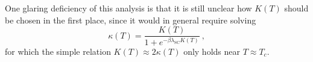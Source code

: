 One glaring deficiency of this analysis is that it is still unclear how $ K(T) $ should be chosen in the first place, since it would in general require solving
\begin{equation}
\kappa(T) = \frac{K(T)}{1 + e^{- \beta \lambda_{\text{SC}} K(T)}} ~ ,
\label{eq:kappa_temp}
\end{equation}
for which the simple relation $ K(T) \approx 2 \kappa(T) $ only holds near $ T \approx T_c $.

